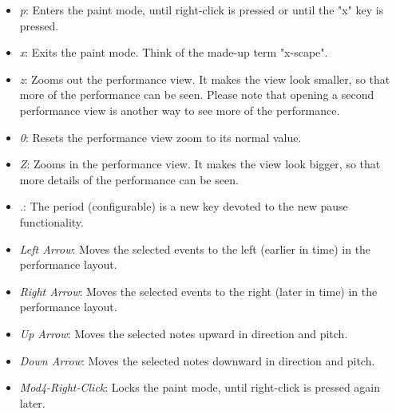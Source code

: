    \begin{itemize}
      \item \textsl{p}:  Enters the paint mode, until right-click is pressed or
         until the "x" key is pressed.
      \item \textsl{x}:  Exits the paint mode.  Think of the made-up term
         "x-scape".
      \item \textsl{z}:  Zooms out the performance view.  It makes the view
         look smaller, so that more of the performance can be seen.  Please
         note that opening a second performance view is another way to see more
         of the performance.
      \item \textsl{0}:  Resets the performance view zoom to its normal value.
      \item \textsl{Z}:  Zooms in the performance view.  It makes the view
         look bigger, so that more details of the performance can be seen.
      \item \textsl{.}:  The period (configurable) is a new key devoted to the
         new pause functionality.
      \item \textsl{Left Arrow}:  Moves the selected events to the left (earlier
         in time) in the performance layout.
      \item \textsl{Right Arrow}:  Moves the selected events to the right (later
         in time) in the performance layout.
      \item \textsl{Up Arrow}:  Moves the selected notes upward in direction
         and pitch.
      \item \textsl{Down Arrow}:  Moves the selected notes downward in
         direction and pitch.
      \item \textsl{Mod4-Right-Click}:  Locks the paint mode, until right-click
         is pressed again later.
   \end{itemize}

